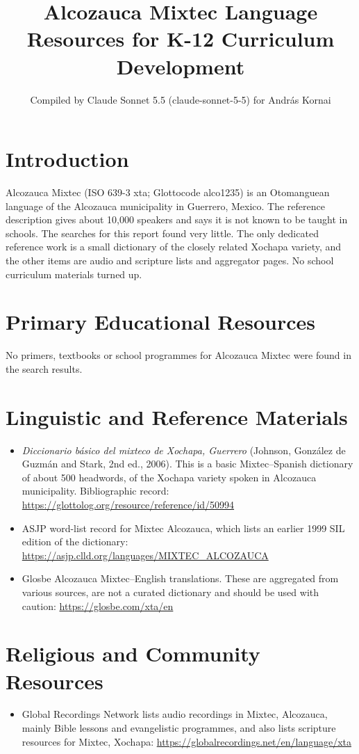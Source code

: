 \documentclass[12pt]{article}
\title{Alcozauca Mixtec Language Resources for K-12 Curriculum Development}
\author{Compiled by Claude Sonnet 5.5 (claude-sonnet-5-5) for Andr\'as Kornai}
\date{}
\begin{document}
\maketitle

\section{Introduction}
Alcozauca Mixtec (ISO 639-3 xta; Glottocode alco1235) is an Otomanguean language of the Alcozauca municipality in Guerrero, Mexico. The reference description gives about 10,000 speakers and says it is not known to be taught in schools. The searches for this report found very little. The only dedicated reference work is a small dictionary of the closely related Xochapa variety, and the other items are audio and scripture lists and aggregator pages. No school curriculum materials turned up.

\section{Primary Educational Resources}
No primers, textbooks or school programmes for Alcozauca Mixtec were found in the search results.

\section{Linguistic and Reference Materials}
\begin{itemize}
\item \emph{Diccionario b\'asico del mixteco de Xochapa, Guerrero} (Johnson, Gonz\'alez de Guzm\'an and Stark, 2nd ed., 2006). This is a basic Mixtec--Spanish dictionary of about 500 headwords, of the Xochapa variety spoken in Alcozauca municipality. Bibliographic record: \url{https://glottolog.org/resource/reference/id/50994}
\item ASJP word-list record for Mixtec Alcozauca, which lists an earlier 1999 SIL edition of the dictionary: \url{https://asjp.clld.org/languages/MIXTEC_ALCOZAUCA}
\item Glosbe Alcozauca Mixtec--English translations. These are aggregated from various sources, are not a curated dictionary and should be used with caution: \url{https://glosbe.com/xta/en}
\end{itemize}

\section{Religious and Community Resources}
\begin{itemize}
\item Global Recordings Network lists audio recordings in Mixtec, Alcozauca, mainly Bible lessons and evangelistic programmes, and also lists scripture resources for Mixtec, Xochapa: \url{https://globalrecordings.net/en/language/xta}
\end{itemize}
\end{document}
